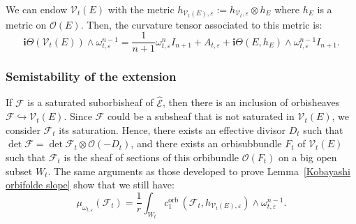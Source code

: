 \documentclass[12pt,a4paper]{amsart}
\newcommand{\orb}{\mathrm{orb}\,}
\theoremstyle{plain}
\theoremstyle{definition}
\begin{document}
We can endow $\mathcal{V}_t(E)$ with the metric $h_{\mathcal{V}_t(E), \varepsilon} := h_{\mathcal{V}_t, \varepsilon} \otimes h_E$ where $h_E$ is a metric on $\mathcal{O}(E)$. Then, the curvature tensor associated to this metric is:
\begin{equation}
    \textbf{i}\Theta(\mathcal{V}_t(E)) \wedge \omega_{t, \varepsilon}^{n-1} = \frac{1}{n+1} \omega_{t, \varepsilon}^n I_{n+1} + A_{t, \varepsilon} + \textbf{i}\Theta(E, h_E) \wedge \omega_{t, \varepsilon}^{n-1} I_{n+1}.
\end{equation}



\subsubsection{Semistability of the extension}\label{Semistability of the extension}

If $\mathcal{F}$ is a saturated suborbisheaf of $\widehat{\mathcal{E}}$, then there is an inclusion of orbisheaves $\mathcal{F} \hookrightarrow \mathcal{V}_t(E)$. Since $\mathcal{F}$ could be a subsheaf that is not saturated in $\mathcal{V}_t(E)$, we consider $\mathcal{F}_t$ its saturation. Hence, there exists an effective divisor $D_t$ such that $\det \mathcal{F} = \det \mathcal{F}_t \otimes \mathcal{O}(-D_t)$, and there exists an orbisubbundle $F_t$ of $\mathcal{V}_t(E)$ such that $\mathcal{F}_t$ is the sheaf of sections of this orbibundle $\mathcal{O}(F_t)$ on a big open subset $W_t$. The same arguments as those developed to prove Lemma~\ref{Kobayashi orbifolde slope} show that we still have:
$$
\mu_{\omega_{t, \varepsilon}}(\mathcal{F}_t) = \frac{1}{r} \int_{W_t} c_1^\orb(\mathcal{F}_t, h_{\mathcal{V}_t(E), \varepsilon}) \wedge \omega_{t, \varepsilon}^{n-1}.
$$
\end{document}
